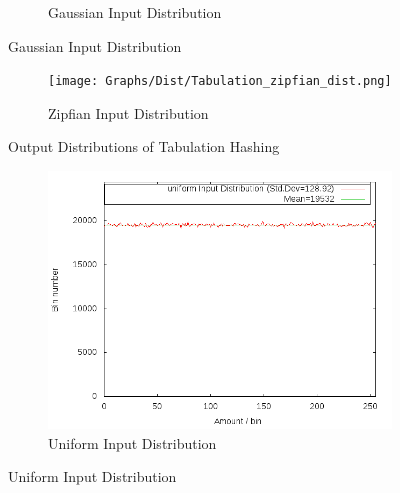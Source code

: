 \documentclass[11pt]{report} %
\begin{document}
\begin{multicols}{2}
\begin{minipage}{\columnwidth}
\begin{figure}[H]
\begin{subfigure}[b]{\textwidth}
    \caption{Gaussian Input Distribution}
    \label{fig:tab_dist_gauss}
  \end{subfigure}
\end{figure}
\begin{figure}[H]\ContinuedFloat
  \centering
  \begin{subfigure}[b]{\textwidth}
    \texttt{[image: Graphs/Dist/Tabulation\_zipfian\_dist.png]}
    \caption{Zipfian Input Distribution}
    \label{fig:tab_dist_exp}
  \end{subfigure}
  \caption{Output Distributions of Tabulation Hashing}\label{fig:tab_dist}
\end{figure}
\end{minipage}
\vfill
\columnbreak
\begin{minipage}{\columnwidth}
\begin{figure}[H]
    \centering
    \begin{subfigure}[b]{\textwidth}
        \includegraphics[width=\textwidth]{Graphs/Dist/Murmur_uniform_dist.png}
        \caption{Uniform Input Distribution}
        \label{fig:murmur_dist_uni}
    \end{subfigure}
\end{figure}
\begin{figure}[H]\ContinuedFloat
    \centering
    \begin{subfigure}[b]{\textwidth}

\end{subfigure}
\end{figure}
\end{minipage}
\end{multicols}
\end{document}

